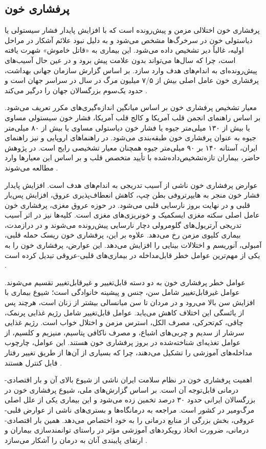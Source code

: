 \subsection{پرفشاری خون}
پرفشاری خون اختلالی مزمن و پیش‌رونده است که با افزایش پایدار فشار سیستولی یا دیاستولی خون در سرخرگ‌ها مشخص می‌شود و به دلیل نبود علائم آشکار در مراحل اولیه، غالباً دیر تشخیص داده می‌شود. این بیماری به «قاتل خاموش» شهرت یافته است، چرا که سال‌ها می‌تواند بدون علامت پیش برود و در عین حال آسیب‌های پیش‌رونده‌ای به اندام‌های هدف وارد سازد. بر اساس گزارش سازمان جهانی بهداشت، پرفشاری خون عامل اصلی بیش از ۷/۵ میلیون مرگ در سال در سراسر جهان است و حدود یک‌سوم بزرگسالان جهان را درگیر می‌کند \cite{who2023hypertension}.
\par
معیار تشخیص پرفشاری خون بر اساس میانگین اندازه‌گیری‌های مکرر تعریف می‌شود. بر اساس راهنمای انجمن قلب آمریکا و کالج قلب آمریکا، فشار خون سیستولی مساوی یا بیش از ۱۳۰ میلی‌متر جیوه یا فشار خون دیاستولی مساوی یا بیش از ۸۰ میلی‌متر جیوه به عنوان پرفشاری خون طبقه‌بندی می‌شود. در راهنماهای اروپایی و نیز راهنمای ایران، آستانه ۱۴۰ بر ۹۰ میلی‌متر جیوه همچنان معیار تشخیصی رایج است. در پژوهش حاضر، بیماران تازه‌تشخیص‌داده‌شده با تأیید متخصص قلب و بر اساس این معیارها وارد مطالعه می‌شوند \cite{whelt2017aha,williams2018esc}.
\par
عوارض پرفشاری خون ناشی از آسیب تدریجی به اندام‌های هدف است. افزایش پایدار فشار خون منجر به هایپرتروفی بطن چپ، کاهش انعطاف‌پذیری عروق، افزایش پس‌بار قلبی و در نهایت بروز نارسایی قلبی می‌شود. در حوزه عروق مغزی، پرفشاری خون عامل اصلی سکته مغزی ایسکمیک و خونریزی‌های مغزی است. کلیه‌ها نیز در اثر آسیب تدریجی آرتریول‌های گلومرولی دچار نارسایی پیش‌رونده می‌شوند و در درازمدت، بیماری کلیوی مزمن رخ می‌دهد. علاوه بر این، پرفشاری خون ریسک حمله قلبی، آمبولی، آنوریسم و اختلالات بینایی را افزایش می‌دهد. این عوارض، پرفشاری خون را به یکی از مهم‌ترین عوامل خطر قابل‌مداخله در بیماری‌های قلبی-عروقی تبدیل کرده است \cite{lim2012gbd}.
\par
عوامل خطر پرفشاری خون به دو دسته قابل‌تغییر و غیرقابل‌تغییر تقسیم می‌شوند. عوامل غیرقابل‌تغییر شامل سن، جنس و پیشینه خانوادگی است؛ شیوع بیماری با افزایش سن بالا می‌رود و در مردان تا سن میانسالی بیشتر از زنان است، هرچند پس از یائسگی این اختلاف کاهش می‌یابد. عوامل قابل‌تغییر شامل رژیم غذایی پرنمک، چاقی، کم‌تحرکی، مصرف الکل، استرس مزمن و اختلال خواب است. رژیم غذایی سرشار از سدیم و چربی‌های اشباع، و مصرف ناکافی پتاسیم، منیزیم و کلسیم، از عوامل تغذیه‌ای شناخته‌شده در بروز پرفشاری خون هستند. این عوامل، چارچوب مداخله‌های آموزشی را تشکیل می‌دهند، چرا که بسیاری از آن‌ها از طریق تغییر رفتار قابل کنترل هستند \cite{whelt2017aha}.
\par
اهمیت پرفشاری خون در نظام سلامت ایران ناشی از شیوع بالای آن و بار اقتصادی-درمانی قابل‌توجه آن است. بر اساس گزارش‌های ملی، شیوع پرفشاری خون در بزرگسالان ایرانی حدود ۳۰ درصد تخمین زده می‌شود و این بیماری یکی از علل اصلی مرگ‌ومیر در کشور است. مراجعه به درمانگاه‌ها و بستری‌های ناشی از عوارض قلبی-عروقی، بخش بزرگی از منابع درمانی را به خود اختصاص می‌دهد. همین بار اقتصادی-درمانی، ضرورت اتخاذ رویکردهای آموزشی مؤثر در راستای توانمندسازی بیماران و ارتقای پایبندی آنان به درمان را آشکار می‌سازد \cite{sarrafzadegan2019iran}.

